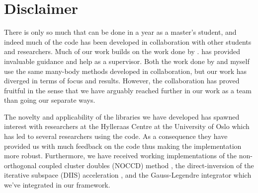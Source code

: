     \section{Disclaimer}
        There is only so much that can be done in a year as a master's student,
        and indeed much of the code has been developed in collaboration with
        other students and researchers.
        Much of our work builds on the work done by
        \citeauthor{kristiansen2017time} \cite{kristiansen2017time}.
        \citeauthor{kristiansen2017time} has provided invaluable guidance and
        help as a supervisor.
        Both the work done by \citeauthor{greg-winther} \cite{greg-winther} and
        myself use the same many-body methods developed in collaboration, but
        our work has diverged in terms of focus and results.
        However, the collaboration has proved fruitful in the sense that we have
        arguably reached further in our work as a team than going our separate
        ways.

        The novelty and applicability of the libraries we have developed has
        spawned interest with researchers at the Hylleraas Centre at the
        University of Oslo which has led to several researchers using the code.
        As a consequence they have provided us with much feedback on the code
        thus making the implementation more robust.
        Furthermore, we have received working implementations of the
        non-orthogonal coupled cluster doubles (NOCCD) method \cite{rolf-nocc},
        the direct-inversion of the iterative subspace (DIIS) acceleration
        \cite{rolf-nocc}, and the Gauss-Legendre \cite{pedersen2018symplectic}
        integrator which we've integrated in our framework.
